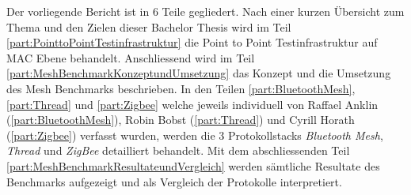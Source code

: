 Der vorliegende Bericht ist in 6 Teile gegliedert.
Nach einer kurzen Übersicht zum Thema und den Zielen dieser Bachelor Thesis wird im Teil \ref{part:PointtoPointTestinfrastruktur} die Point to Point Testinfrastruktur auf MAC Ebene behandelt.
Anschliessend wird im Teil \ref{part:MeshBenchmarkKonzeptundUmsetzung} das Konzept und die Umsetzung des Mesh Benchmarks beschrieben.
In den Teilen \ref{part:BluetoothMesh}, \ref{part:Thread} und \ref{part:Zigbee} welche jeweils individuell von Raffael Anklin (\ref{part:BluetoothMesh}), Robin Bobst (\ref{part:Thread}) und Cyrill Horath (\ref{part:Zigbee}) verfasst wurden, werden die 3 Protokollstacks \textit{Bluetooth Mesh}, \textit{Thread} und \textit{ZigBee} detailliert behandelt.
Mit dem abschliessenden Teil \ref{part:MeshBenchmarkResultateundVergleich} werden sämtliche Resultate des Benchmarks aufgezeigt und als Vergleich der Protokolle interpretiert.



